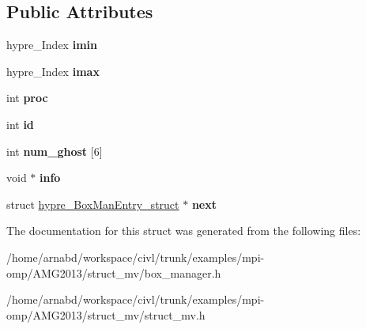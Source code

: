 \subsection*{Public Attributes}
\begin{DoxyCompactItemize}
\item 
\hypertarget{structhypre__BoxManEntry__struct_a8ad56ce6288a3933ee434f340978968d}{}hypre\+\_\+\+Index {\bfseries imin}\label{structhypre__BoxManEntry__struct_a8ad56ce6288a3933ee434f340978968d}

\item 
\hypertarget{structhypre__BoxManEntry__struct_a7882172a32784219b67bcc139a739eb8}{}hypre\+\_\+\+Index {\bfseries imax}\label{structhypre__BoxManEntry__struct_a7882172a32784219b67bcc139a739eb8}

\item 
\hypertarget{structhypre__BoxManEntry__struct_ae940d4c996e2c8c43497d4a3d4f56cf6}{}int {\bfseries proc}\label{structhypre__BoxManEntry__struct_ae940d4c996e2c8c43497d4a3d4f56cf6}

\item 
\hypertarget{structhypre__BoxManEntry__struct_a00f39fdd0021cbca523ecf159bee3cca}{}int {\bfseries id}\label{structhypre__BoxManEntry__struct_a00f39fdd0021cbca523ecf159bee3cca}

\item 
\hypertarget{structhypre__BoxManEntry__struct_a7f7746e5278fbf706d39f3918fdeaa3b}{}int {\bfseries num\+\_\+ghost} \mbox{[}6\mbox{]}\label{structhypre__BoxManEntry__struct_a7f7746e5278fbf706d39f3918fdeaa3b}

\item 
\hypertarget{structhypre__BoxManEntry__struct_a67ca51b1d77d7142dd3b2a71d5343e43}{}void $\ast$ {\bfseries info}\label{structhypre__BoxManEntry__struct_a67ca51b1d77d7142dd3b2a71d5343e43}

\item 
\hypertarget{structhypre__BoxManEntry__struct_a397609c47ed787619e55fa450d1f297d}{}struct \hyperlink{structhypre__BoxManEntry__struct}{hypre\+\_\+\+Box\+Man\+Entry\+\_\+struct} $\ast$ {\bfseries next}\label{structhypre__BoxManEntry__struct_a397609c47ed787619e55fa450d1f297d}

\end{DoxyCompactItemize}


The documentation for this struct was generated from the following files\+:\begin{DoxyCompactItemize}
\item 
/home/arnabd/workspace/civl/trunk/examples/mpi-\/omp/\+A\+M\+G2013/struct\+\_\+mv/box\+\_\+manager.\+h\item 
/home/arnabd/workspace/civl/trunk/examples/mpi-\/omp/\+A\+M\+G2013/struct\+\_\+mv/struct\+\_\+mv.\+h\end{DoxyCompactItemize}
